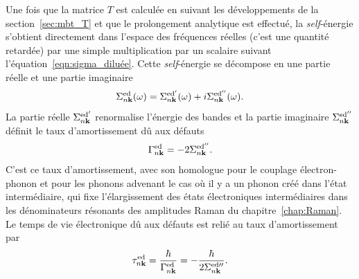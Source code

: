Une fois que la matrice $T$ est calculée en suivant les développements de la section~\ref{sec:mbt_T} et que le prolongement analytique est effectué, la \textit{self}-énergie s'obtient directement dans l'espace des fréquences réelles (c'est une quantité retardée) par une simple multiplication par un scalaire suivant l'équation~\eqref{eqn:sigma_diluée}. Cette \textit{self}-énergie se décompose en une partie réelle et une partie imaginaire
\begin{equation}
    \Sigma_{n\mathbf{k}}^\text{ed}(\omega) = \Sigma_{n\mathbf{k}}^{\text{ed}'}(\omega) + i\Sigma_{n\mathbf{k}}^{\text{ed}''}(\omega).
\end{equation}
La partie réelle $\Sigma_{n\mathbf{k}}^{\text{ed}'}$ renormalise l'énergie des bandes et la partie imaginaire $\Sigma_{n\mathbf{k}}^{\text{ed}''}$ définit le taux d'amortissement dû aux défauts
\begin{equation}
\Gamma_{n\mathbf{k}}^{\text{ed}} = -2\Sigma_{n\mathbf{k}}^{\text{ed}''}.
\end{equation}
C'est ce taux d'amortissement, avec son homologue pour le couplage électron-phonon et pour les phonons advenant le cas où il y a un phonon créé dans l'état intermédiaire, qui fixe l'élargissement des états électroniques intermédiaires dans les dénominateurs résonants des amplitudes Raman du chapitre~\ref{chap:Raman}. Le temps de vie électronique dû aux défauts est relié au taux d'amortissement par
\begin{equation}
    \tau^\text{ed}_{n\mathbf{k}} = \frac{\hbar}{\Gamma^\text{ed}_{n\mathbf{k}}} = -\frac{\hbar}{2\Sigma^{\text{ed}\prime\prime}_{n\mathbf{k}}}.
\end{equation}

